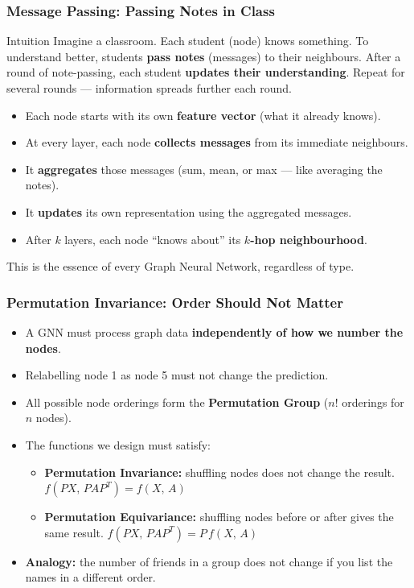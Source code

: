 \begin{frame}[fragile]\frametitle{Message Passing: Passing Notes in Class}

\begin{block}{Intuition}
Imagine a classroom. Each student (node) knows something. To understand better, students \textbf{pass notes} (messages) to their neighbours. After a round of note-passing, each student \textbf{updates their understanding}. Repeat for several rounds --- information spreads further each round.
\end{block}

\begin{itemize}
  \item Each node starts with its own \textbf{feature vector} (what it already knows).
  \item At every layer, each node \textbf{collects messages} from its immediate neighbours.
  \item It \textbf{aggregates} those messages (sum, mean, or max --- like averaging the notes).
  \item It \textbf{updates} its own representation using the aggregated messages.
  \item After $k$ layers, each node ``knows about'' its \textbf{$k$-hop neighbourhood}.
\end{itemize}

\vspace{0.1cm}
{\small This is the essence of every Graph Neural Network, regardless of type.}

\end{frame}

\begin{frame}[fragile]\frametitle{Permutation Invariance: Order Should Not Matter}

\begin{itemize}
\item A GNN must process graph data \textbf{independently of how we number the nodes}.
\item Relabelling node 1 as node 5 must not change the prediction.
\item All possible node orderings form the \textbf{Permutation Group} ($n!$ orderings for $n$ nodes).
\item The functions we design must satisfy:
  \begin{itemize}
    \item \textbf{Permutation Invariance:} shuffling nodes does not change the result.
    $f(PX,\,PAP^T) = f(X,\,A)$
    \item \textbf{Permutation Equivariance:} shuffling nodes before or after gives the same result.
    $f(PX,\,PAP^T) = P\,f(X,\,A)$
  \end{itemize}
\item \textbf{Analogy:} the number of friends in a group does not change if you list the names in a different order.
\end{itemize}

\end{frame}

